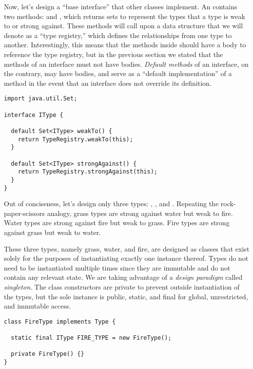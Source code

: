 Now, let's design a ``base interface'' that other classes implement. An  contains two methods:  and , which returns sets to represent the types that a type is weak to or strong against. These methods will call upon a data structure that we will denote as a ``type registry,'' which defines the relationships from one type to another. Interestingly, this means that the methods inside  should have a body to reference the type registry, but in the previous section we stated that the methods of an interface must not have bodies. \emph{Default methods} of an interface, on the contrary, may have bodies, and serve as a ``default implementation'' of a method in the event that an interface does not override its definition.

\begin{lstlisting}[language=MyJava]
import java.util.Set;

interface IType {

  default Set<IType> weakTo() {
    return TypeRegistry.weakTo(this);
  }

  default Set<IType> strongAgainst() {
    return TypeRegistry.strongAgainst(this);
  }
}
\end{lstlisting}

Out of conciseness, let's design only three types: , , and . Repeating the rock-paper-scissors analogy, grass types are strong against water but weak to fire. Water types are strong against fire but weak to grass. Fire types are strong against grass but weak to water. 

These three types, namely grass, water, and fire, are designed as classes that exist solely for the purposes of instantiating exactly one instance thereof. Types do not need to be instantiated multiple times since they are immutable and do not contain any relevant state. We are taking advantage of a \emph{design paradigm} called \emph{singleton}. The class constructors are private to prevent outside instantiation of the types, but the sole instance is public, static, and final for global, unrestricted, and immutable access.

\begin{lstlisting}[language=MyJava]
class FireType implements Type {

  static final IType FIRE_TYPE = new FireType();

  private FireType() {}
}
\end{lstlisting}

